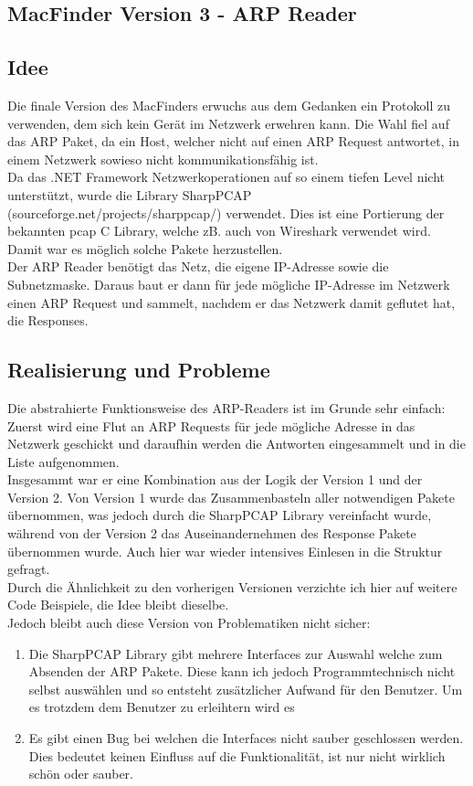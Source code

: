 \documentclass[12pt,a4paper]{report}
\begin{document}
\begin{onehalfspace}
\section{MacFinder Version 3 - ARP Reader}
\subsection{Idee}
Die finale Version des MacFinders erwuchs aus dem Gedanken ein Protokoll zu verwenden, dem sich kein Gerät im Netzwerk erwehren kann. Die Wahl fiel auf das ARP Paket, da ein Host, welcher nicht auf einen ARP Request antwortet, in einem Netzwerk sowieso nicht kommunikationsfähig ist.\\
Da das .NET Framework Netzwerkoperationen auf so einem tiefen Level nicht unterstützt, wurde die Library SharpPCAP (sourceforge.net/projects/sharppcap/) verwendet. Dies ist eine Portierung der bekannten pcap C Library, welche zB. auch von Wireshark verwendet wird. Damit war es möglich solche Pakete herzustellen.\\
Der ARP Reader benötigt das Netz, die eigene IP-Adresse sowie die Subnetzmaske. Daraus baut er dann für jede mögliche IP-Adresse im Netzwerk einen ARP Request und sammelt, nachdem er das Netzwerk damit geflutet hat, die Responses.\\
\subsection{Realisierung und Probleme}
Die abstrahierte Funktionsweise des ARP-Readers ist im Grunde sehr einfach: Zuerst wird eine Flut an ARP Requests für jede mögliche Adresse in das Netzwerk geschickt und daraufhin werden die Antworten eingesammelt und in die Liste aufgenommen.\\
Insgesammt war er eine Kombination aus der Logik der Version 1 und der Version 2. Von Version 1 wurde das Zusammenbasteln aller notwendigen Pakete übernommen, was jedoch durch die SharpPCAP Library vereinfacht wurde, während von der Version 2 das Auseinandernehmen des Response Pakete übernommen wurde. Auch hier war wieder intensives Einlesen in die Struktur gefragt.\\
Durch die Ähnlichkeit zu den vorherigen Versionen verzichte ich hier auf weitere Code Beispiele, die Idee bleibt dieselbe.\\

Jedoch bleibt auch diese Version von Problematiken nicht sicher:\\
\begin{enumerate}
\item Die SharpPCAP Library gibt mehrere Interfaces zur Auswahl welche zum Absenden der ARP Pakete. Diese kann ich jedoch Programmtechnisch nicht selbst auswählen und so entsteht zusätzlicher Aufwand für den Benutzer. Um es trotzdem dem Benutzer zu erleihtern wird es
\item Es gibt einen Bug bei welchen die Interfaces nicht sauber geschlossen werden. Dies bedeutet keinen Einfluss auf die Funktionalität, ist nur nicht wirklich schön oder sauber.
\end{enumerate}


\end{onehalfspace}
\end{document}

